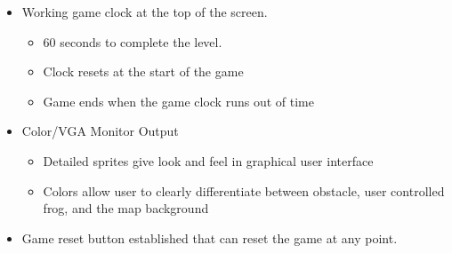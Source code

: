 \documentclass[journal, twocolumn, final,11pt,letterpaper]{IEEEtran}
\begin{document}
\begin{itemize}
	\item Working game clock at the top of the screen.
		\begin{itemize}
			\item 60 seconds to complete the level.
			\item Clock resets at the start of the game
			\item Game ends when the game clock runs out of time
		\end{itemize} 
	\item Color/VGA Monitor Output
	\begin{itemize}
		\item Detailed sprites give look and feel in graphical user interface
		\item Colors allow user to clearly differentiate between obstacle, user controlled frog, and the map background
	\end{itemize}
	\item Game reset button established that can reset the game at any point.
\end{itemize}

%

\end{document}
